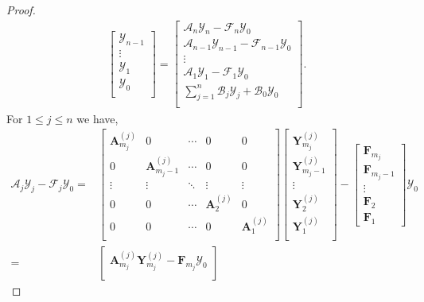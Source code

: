 \documentclass[12pt, reqno]{amsart}
\theoremstyle{definition}
\theoremstyle{remark}
\numberwithin{equation}{section}
\begin{document}
\begin{proof}
\begin{align*}
\begin{bmatrix}
\mathcal{Y}_{n-1} \\
\vdots \\
\mathcal{Y}_1 \\
\mathcal{Y}_0\\
\end{bmatrix} 
= \begin{bmatrix} 
\mathcal{A}_n \mathcal{Y}_n-\mathcal{F}_n\mathcal{Y}_0 \\
\mathcal{A}_{n-1} \mathcal{Y}_{n-1}-\mathcal{F}_{n-1}\mathcal{Y}_0 \\
\vdots \\
\mathcal{A}_1 \mathcal{Y}_1-\mathcal{F}_1\mathcal{Y}_0 \\
\displaystyle \sum_{j=1}^{n} \mathcal{B}_j \mathcal{Y}_j + \mathcal{B}_0\mathcal{Y}_0\\
\end{bmatrix}.
\end{align*}
For $1 \leq j \leq n$ we have, 
\begin{align*}
\mathcal{A}_{j} \mathcal{Y}_j-\mathcal{F}_{j}\mathcal{Y}_0= &\begin{bmatrix}
\textbf{A}_{m_j}^{(j)} & 0 & \cdots & 0 & 0 \\
0 & \textbf{A}_{m_j -1}^{(j)} & \cdots & 0 & 0 \\
\vdots & \vdots & \ddots & \vdots & \vdots \\
0 & 0 & \cdots & \textbf{A}_{2}^{(j)} & 0 \\
0 & 0 & \cdots & 0 & \textbf{A}_{1}^{(j)} \\
\end{bmatrix} \begin{bmatrix}
\textbf{Y}_{m_j}^{(j)} \\
\textbf{Y}_{m_j -1}^{(j)} \\
\vdots \\
\textbf{Y}_{2}^{(j)} \\
\textbf{Y}_{1}^{(j)}\\
\end{bmatrix}- \begin{bmatrix}
\textbf{F}_{m_j} \\
\textbf{F}_{m_j-1} \\
\vdots \\
\textbf{F}_2\\
\textbf{F}_1
\end{bmatrix}\mathcal{Y}_0\\ 
=& \begin{bmatrix}
\textbf{A}_{m_j}^{(j)}\textbf{Y}_{m_j}^{(j)}-\textbf{F}_{m_j}\mathcal{Y}_0\\

\end{bmatrix}
\end{align*}
\end{proof}
\end{document}
